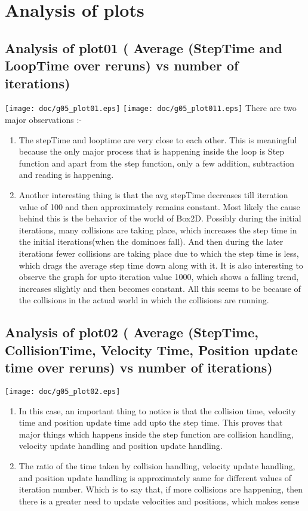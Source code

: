\documentclass[11pt,english]{article}
\begin{document}
\section{
	Analysis of plots
}
\subsection{
Analysis of plot01 ( Average (StepTime and LoopTime over reruns) vs number of iterations) }
\texttt{[image: doc/g05\_plot01.eps]}
\texttt{[image: doc/g05\_plot011.eps]}
There are two major observations :-
\begin{enumerate}
\item The stepTime and looptime are very close to each other. This is meaningful because the only major process that is happening inside the loop is Step function and apart from the step function, only a few addition, subtraction and reading is happening.
\item Another interesting thing is that the avg stepTime decreases till iteration value of 100 and then approximately remains constant. Most likely the cause behind this is the behavior of the world of Box2D. Possibly during the initial iterations, many collisions are taking place, which increases the step time in the initial iterations(when the dominoes fall). And then during the later iterations fewer collisions are taking place due to which the step time is less, which drags the average step time down along with it. It is also interesting to observe the graph for upto iteration value 1000, which shows a falling trend, increases slightly and then becomes constant. All this seems to be because of the collisions in the actual world in which the collisions are running.
\end{enumerate}



\subsection{
Analysis of plot02 ( Average (StepTime, CollisionTime, Velocity Time, Position update time over reruns) vs number of iterations) }
\texttt{[image: doc/g05\_plot02.eps]}
\begin{enumerate}
\item In this case, an important thing to notice is that the collision time, velocity time and position update time add upto the step time. This proves that major things which happens inside the step function are collision handling, velocity update handling and position update handling.
\item The ratio of the time taken by collision handling, velocity update handling, and position update handling is approximately same for different values of iteration number. Which is to say that, if more collisions are happening, then there is a greater need to update velocities and positions, which makes sense

\end{enumerate}
\end{document}
